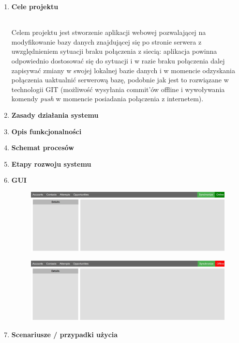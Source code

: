 \documentclass[a4paper,11pt]{article}
\begin{document}
\begin{enumerate}
	\newpage
	\item \textbf{{\Large Cele projektu}}\\ \\
	\begin{large}
	\hspace*{1cm}
			Celem projektu jest stworzenie aplikacji webowej pozwalającej na modyfikowanie bazy danych znajdującej się po stronie serwera z uwzględnieniem sytuacji braku połączenia z siecią: aplikacja powinna odpowiednio dostosować się do sytuacji i w razie braku połączenia dalej zapisywać zmiany w swojej lokalnej bazie danych i w momencie odzyskania połączenia uaktualnić serwerową bazę, podobnie jak jest to rozwiązane w technologii GIT (możliwość wysyłania commit'ów offline i wywoływania komendy \textit{push} w momencie posiadania połączenia z internetem).

	
	\end{large}

	\item \textbf{{\Large Zasady działania systemu}}\\
	
	\item \textbf{{\Large Opis funkcjonalności}}\\

	\item \textbf{{\Large Schemat procesów}}\\
	
	\item \textbf{{\Large Etapy rozwoju systemu}}\\
	
	\item \textbf{{\Large GUI}}\\
	
		\begin{figure}[!htb]
			\centerline{\includegraphics[scale=0.3]{online.jpg}}
		\end{figure}

		\begin{figure}[!htb]
			\centerline{\includegraphics[scale=0.3]{offline.jpg}}
		\end{figure}	
	
	\item \textbf{{\Large Scenariusze / przypadki użycia}}\\
	
	\newpage
	


	
\end{enumerate}
\end{document}
